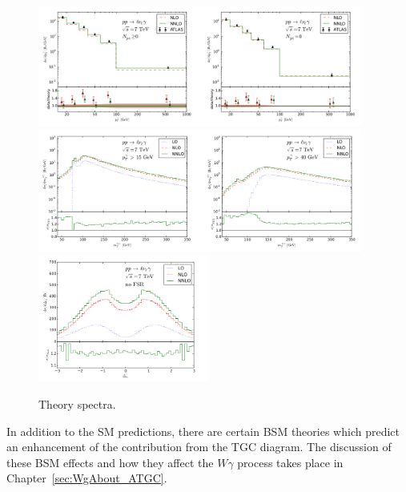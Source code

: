 \begin{figure}[htb]
  \begin{center}
    {\includegraphics[width=0.95\textwidth]{../figs/WgAbout/Theory_NNLO_PtGamma.png}}    
    {\includegraphics[width=0.95\textwidth]{../figs/WgAbout/Theory_NNLO_mT_finer.png}}
    {\includegraphics[width=0.50\textwidth]{../figs/WgAbout/Theory_NNLO_rapidity.png}}
    \caption{Theory spectra.}
    \label{fig:Theory_NNLO_and_other}
  \end{center}
\end{figure}

In addition to the SM predictions, there are certain BSM theories which predict an enhancement of the contribution from the TGC diagram. The discussion of these BSM effects and how they affect the $W\gamma$ process takes place in Chapter~\ref{sec:WgAbout_ATGC}.\\ 


